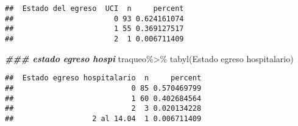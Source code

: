 \documentclass[
]{article}
\newenvironment{Shaded}{\begin{snugshade}}{\end{snugshade}}
\newcommand{\AttributeTok}[1]{\textcolor[rgb]{0.77,0.63,0.00}{#1}}
\newcommand{\DocumentationTok}[1]{\textcolor[rgb]{0.56,0.35,0.01}{\textbf{\textit{#1}}}}
\newcommand{\FunctionTok}[1]{\textcolor[rgb]{0.00,0.00,0.00}{#1}}
\newcommand{\NormalTok}[1]{#1}
\newcommand{\SpecialCharTok}[1]{\textcolor[rgb]{0.00,0.00,0.00}{#1}}
\newcommand{\StringTok}[1]{\textcolor[rgb]{0.31,0.60,0.02}{#1}}
\begin{document}
\begin{verbatim}
##  Estado del egreso  UCI  n     percent
##                       0 93 0.624161074
##                       1 55 0.369127517
##                       2  1 0.006711409
\end{verbatim}

\begin{Shaded}
\begin{Highlighting}[]
\DocumentationTok{\#\#\# estado egreso hospi}
\NormalTok{traqueo}\SpecialCharTok{\%\textgreater{}\%}
  \FunctionTok{tabyl}\NormalTok{(}\StringTok{\textasciigrave{}}\AttributeTok{Estado egreso hospitalario}\StringTok{\textasciigrave{}}\NormalTok{)}
\end{Highlighting}
\end{Shaded}

\begin{verbatim}
##  Estado egreso hospitalario  n     percent
##                           0 85 0.570469799
##                           1 60 0.402684564
##                           2  3 0.020134228
##                  2 al 14.04  1 0.006711409
\end{verbatim}
\end{document}

